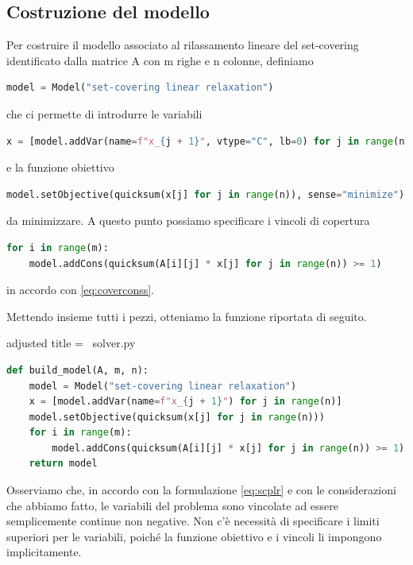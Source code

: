 \subsection{Costruzione del modello}\label{sec:buildmodel}
Per costruire il modello associato al rilassamento lineare del set-covering identificato dalla matrice {\jbm A} con
{\jbm m} righe e {\jbm n} colonne, definiamo

\begin{inline}
\begin{lstlisting}[style = style2, language=python]
model = Model("set-covering linear relaxation")
\end{lstlisting}
\end{inline}
\noindent
che ci permette di introdurre le variabili
\begin{inline}
\begin{lstlisting}[style = style2, language=python]
x = [model.addVar(name=f"x_{j + 1}", vtype="C", lb=0) for j in range(n)]
\end{lstlisting}
\end{inline}
\noindent
e la funzione obiettivo
\begin{inline}
\begin{lstlisting}[style = style2, language=python]
model.setObjective(quicksum(x[j] for j in range(n)), sense="minimize")
\end{lstlisting}
\end{inline}
\noindent
da minimizzare. A questo punto possiamo specificare i vincoli di copertura
\begin{inline}
\begin{lstlisting}[style = style2, language=python]
for i in range(m):
    model.addCons(quicksum(A[i][j] * x[j] for j in range(n)) >= 1)
\end{lstlisting}
\end{inline}
\noindent
in accordo con \eqref{eq:coverconss}.

Mettendo insieme tutti i pezzi, otteniamo la funzione riportata di seguito.
\begin{code}{adjusted title = {\pyicon\ solver.py}}
\begin{lstlisting}[language=python, style = style, caption={Costruzione del modello per l'algoritmo del simplesso.}]
def build_model(A, m, n):
    model = Model("set-covering linear relaxation")
    x = [model.addVar(name=f"x_{j + 1}") for j in range(n)]
    model.setObjective(quicksum(x[j] for j in range(n)))
    for i in range(m):
        model.addCons(quicksum(A[i][j] * x[j] for j in range(n)) >= 1)
    return model
\end{lstlisting}
\end{code}
\noindent
Osserviamo che, in accordo con la formulazione \eqref{eq:scplr} e con le considerazioni che abbiamo fatto, le variabili
del problema sono vincolate ad essere semplicemente continue non negative. Non c'è necessità di specificare i limiti
superiori per le variabili, poiché la funzione obiettivo e i vincoli li impongono implicitamente.


